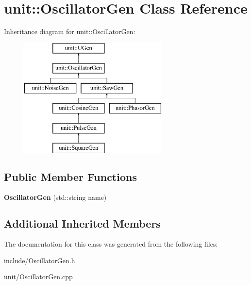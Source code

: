 \hypertarget{classunit_1_1OscillatorGen}{}\section{unit\+:\+:Oscillator\+Gen Class Reference}
\label{classunit_1_1OscillatorGen}
Inheritance diagram for unit\+:\+:Oscillator\+Gen\+:\begin{figure}[H]
\begin{center}
\leavevmode
\includegraphics[height=6.000000cm]{classunit_1_1OscillatorGen}
\end{center}
\end{figure}
\subsection*{Public Member Functions}
\begin{DoxyCompactItemize}
\item 
{\bfseries Oscillator\+Gen} (std\+::string name)\hypertarget{classunit_1_1OscillatorGen_ab84067cdd1c0a20d238ddcaaadda12da}{}\label{classunit_1_1OscillatorGen_ab84067cdd1c0a20d238ddcaaadda12da}

\end{DoxyCompactItemize}
\subsection*{Additional Inherited Members}


The documentation for this class was generated from the following files\+:\begin{DoxyCompactItemize}
\item 
include/Oscillator\+Gen.\+h\item 
unit/Oscillator\+Gen.\+cpp\end{DoxyCompactItemize}
